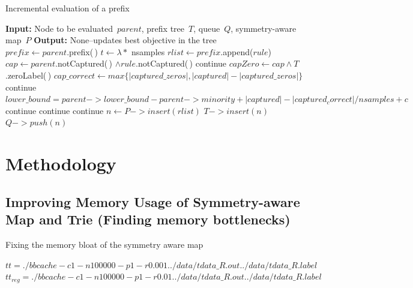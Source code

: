 \documentclass[]{article}
\theoremstyle{definition}
\begin{document}
\begin{algorithm}[t!]
  \caption{Incremental evaluation of a prefix}
\label{alg:incremental}
\begin{algorithmic}
\normalsize
\State \textbf{Input:} Node to be evaluated~$parent$,
prefix tree~$T$,
queue~$Q$,
symmetry-aware map~$P$
\State \textbf{Output:} None--updates best objective in the tree\\
\State $prefix \gets parent$.prefix(\,)
\State $t \gets \lambda *$ nsamples 
	\State $rlist \gets prefix$.append($rule$)
	\State $cap \gets parent$.notCaptured(\,) $\wedge rule$.notCaptured(\,)
	 
		\State continue
	\EndIf
	\State $capZero \gets cap \wedge T$.zeroLabel(\,) 
	\State $cap\_correct \gets max\{|captured\_zeros|, |captured| - |captured\_zeros|\}$
	 
		\State continue
	\EndIf
	\State $lower\_bound = parent->lower\_bound - parent->minority + |captured| - |captured_correct| / nsamples + c$
	 
		\State continue
	\EndIf
	 
		\State continue
	\EndIf
	 
		\State continue
	\EndIf
	\State $n \gets P->insert(rlist)$ 
		\State $T->insert(n)$
		\State $Q->push(n)$
	\EndIf
\EndFor
\end{algorithmic}
\end{algorithm}


\section{Methodology}

\subsection{Improving Memory Usage of Symmetry-aware Map and Trie (Finding memory bottlenecks)}

Fixing the memory bloat of the symmetry aware map

$tt = ./bbcache -c 1 -n 100000 -p 1 -r 0.001 ../data/tdata\_R.out ../data/tdata\_R.label$
$tt_{reg} = ./bbcache -c 1 -n 100000 -p 1 -r 0.01 ../data/tdata\_R.out ../data/tdata\_R.label$
\end{document}
